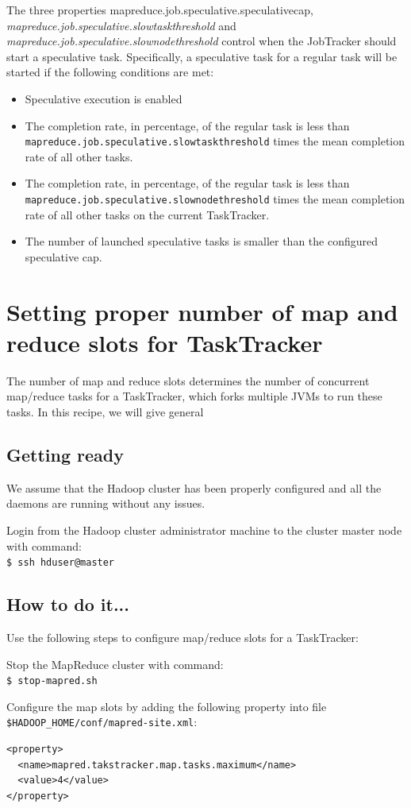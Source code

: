 The three properties mapreduce.job.speculative.speculativecap, \emph{mapreduce.job.speculative.slowtaskthreshold} and \emph{mapreduce.job.speculative.slownodethreshold} control when the JobTracker should start a speculative task. Specifically, a speculative task for a regular task will be started if the following conditions are met:
\begin{itemize}
  \item Speculative execution is enabled
  \item The completion rate, in percentage, of the regular task is less than \verb|mapreduce.job.speculative.slowtaskthreshold| times the mean completion rate of all other tasks.
  \item The completion rate, in percentage, of the regular task is less than \verb|mapreduce.job.speculative.slownodethreshold| times the mean completion rate of all other tasks on the current TaskTracker.
  \item The number of launched speculative tasks is smaller than the configured speculative cap.
\end{itemize}
\section{Setting proper number of map and reduce slots for TaskTracker}
The number of map and reduce slots determines the number of concurrent map/reduce tasks for a TaskTracker, which forks multiple JVMs to run these tasks. In this recipe, we will give general
\subsection*{Getting ready}
We assume that the Hadoop cluster has been properly configured and all the daemons are running without any issues.

Login from the Hadoop cluster administrator machine to the cluster master node with command: \\
\verb|$ ssh hduser@master|
\subsection*{How to do it...}
Use the following steps to configure map/reduce slots for a TaskTracker:

Stop the MapReduce cluster with command: \\
\verb|$ stop-mapred.sh|

Configure the map slots by adding the following property into file \verb|$HADOOP_HOME/conf/mapred-site.xml|:
\lstset{style=bashstyle}
\begin{lstlisting}
<property>
  <name>mapred.takstracker.map.tasks.maximum</name>
  <value>4</value>
</property>
\end{lstlisting}

